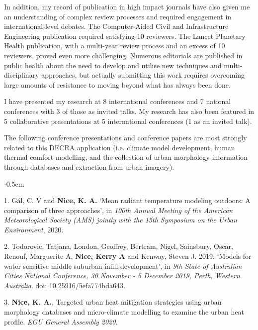 In addition, my record of publication in high impact journals have also given me an understanding of complex review processes and required engagement in international-level debates. The Computer-Aided Civil and Infrastructure Engineering publication required satisfying 10 reviewers. The Lancet Planetary Health publication, with a multi-year review process and an excess of 10 reviewers, proved even more challenging. Numerous editorials are published in public health about the need to develop and utilise new techniques and multi-disciplinary approaches, but actually submitting this work requires overcoming large amounts of resistance to moving beyond what has always been done.

I have presented my research at 8 international conferences and 7 national conferences with 3 of those as invited talks. My research has also been featured in 5 collaborative presentations at 5 international conferences (1 as an invited talk). 

The following conference presentations and conference papers are most strongly related to this DECRA application (i.e. climate model development, human thermal comfort modelling, and the collection of urban morphology information through databases and extraction from urban imagery).

\begin{list}{}{}
\itemsep-0.5em

\item [1.] G\'{a}l, C. V and \textbf{Nice, K. A.} ‘Mean radiant temperature modeling outdoors: A comparison of three approaches’, in \textit{100th Annual Meeting of the American Meteorological Society (AMS) jointly with the 15th Symposium on the Urban Environment}, 2020. 
\item [2.] Todorovic, Tatjana, London, Geoffrey, Bertram, Nigel, Sainsbury, Oscar, Renouf, Marguerite A, \textbf{Nice, Kerry A} and Kenway, Steven J. 2019. ‘Models for water sensitive middle suburban infill development’, in\textit{ 9th State of Australian Cities National Conference, 30 November - 5 December 2019, Perth, Western Australia}. doi: 10.25916/5efa774bda643. 
\item [3.] \textbf{Nice, K. A.}, Targeted urban heat mitigation strategies using urban morphology databases and micro-climate modelling to examine the urban heat profile. \textit{EGU General Assembly 2020}.

\end{list}

